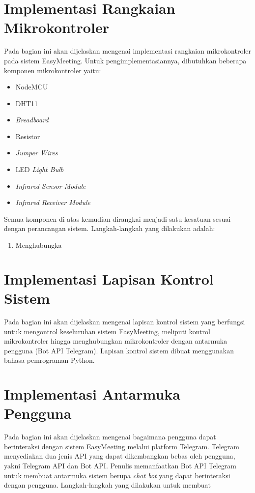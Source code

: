 \section{Implementasi Rangkaian Mikrokontroler}
\tab Pada bagian ini akan dijelaskan mengenai implementasi rangkaian mikrokontroler pada sistem EasyMeeting. Untuk pengimplementasiannya, dibutuhkan beberapa komponen mikrokontroler yaitu:
\begin{itemize}
	\item NodeMCU
	\item DHT11
	\item \textit{Breadboard}
	\item Resistor
	\item \textit{Jumper Wires}
	\item LED \textit{Light Bulb}
	\item \textit{Infrared Sensor Module}
	\item \textit{Infrared Receiver Module}
\end{itemize}
\tab Semua komponen di atas kemudian dirangkai menjadi satu kesatuan sesuai dengan perancangan sistem. Langkah-langkah yang dilakukan adalah:
\begin{enumerate}
	\item Menghubungka
\end{enumerate}

\section{Implementasi Lapisan Kontrol Sistem}
\tab Pada bagian ini akan dijelaskan mengenai lapisan kontrol sistem yang berfungsi untuk mengontrol keseluruhan sistem EasyMeeting, meliputi kontrol mikrokontroler hingga menghubungkan mikrokontroler dengan antarmuka pengguna (Bot API Telegram). Lapisan kontrol sistem dibuat menggunakan bahasa pemrograman Python.

\section{Implementasi Antarmuka Pengguna}
\tab Pada bagian ini akan dijelaskan mengenai bagaimana pengguna dapat berinteraksi dengan sistem EasyMeeting melalui platform Telegram. Telegram menyediakan dua jenis API yang dapat dikembangkan bebas oleh pengguna, yakni Telegram API dan Bot API. Penulis memanfaatkan Bot API Telegram untuk membuat antarmuka sistem berupa \textit{chat bot} yang dapat berinteraksi dengan pengguna.
\tab Langkah-langkah yang dilakukan untuk membuat

